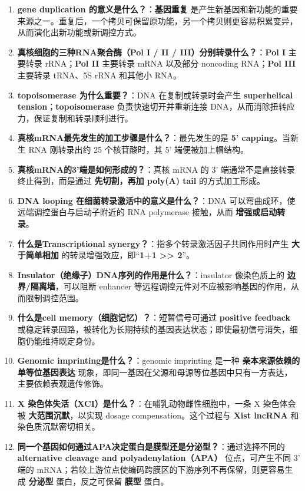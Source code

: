\documentclass[12pt,fontset=none]{ctexart}
\begin{document}
\begin{enumerate}
\item \textbf{gene duplication 的意义是什么？}：\textbf{基因重复} 是产生新基因和新功能的重要来源之一。重复后，一个拷贝可保留原功能，另一个拷贝则更容易积累变异，从而演化出新功能或新调控方式。

\item \textbf{真核细胞的三种RNA聚合酶（Pol I / II / III）分别转录什么？}：\textbf{Pol I} 主要转录 rRNA；\textbf{Pol II} 主要转录 mRNA 以及部分 noncoding RNA；\textbf{Pol III} 主要转录 tRNA、5S rRNA 和其他小 RNA。

\item \textbf{topoisomerase 为什么重要？}：DNA 在复制或转录时会产生 \textbf{superhelical tension}；\textbf{topoisomerase} 负责快速切开并重新连接 DNA，从而消除扭转应力，保证复制和转录顺利进行。

\item \textbf{真核mRNA最先发生的加工步骤是什么？}：最先发生的是 \textbf{5' capping}。当新生 RNA 刚转录出约 25 个核苷酸时，其 5' 端便被加上帽结构。

\item \textbf{真核mRNA的3'端是如何形成的？}：真核 mRNA 的 3' 端通常不是直接转录终止得到，而是通过 \textbf{先切割，再加 poly(A) tail} 的方式加工形成。

\item \textbf{DNA looping 在细菌转录激活中的意义是什么？}：DNA 可以弯曲成环，使远端调控蛋白与启动子附近的 RNA polymerase 接触，从而 \textbf{增强或启动转录}。

\item \textbf{什么是Transcriptional synergy？}：指多个转录激活因子共同作用时产生 \textbf{大于简单相加} 的转录增强效应，即“\textbf{1+1 >> 2}”。

\item \textbf{Insulator（绝缘子）DNA序列的作用是什么？}：insulator 像染色质上的 \textbf{边界/隔离墙}，可以阻断 enhancer 等远程调控元件对不应被影响基因的作用，从而限制调控范围。

\item \textbf{什么是cell memory（细胞记忆）？}：短暂信号可通过 \textbf{positive feedback} 或稳定转录回路，被转化为长期持续的基因表达状态；即使最初信号消失，细胞仍能维持既定身份。

\item \textbf{Genomic imprinting是什么？}：genomic imprinting 是一种 \textbf{亲本来源依赖的单等位基因表达} 现象，即同一基因在父源和母源等位基因中只有一方表达，主要依赖表观遗传修饰。

\item \textbf{X 染色体失活（XCI）是什么？}：在哺乳动物雌性细胞中，一条 X 染色体会被 \textbf{大范围沉默}，以实现 dosage compensation。这个过程与 \textbf{Xist lncRNA} 和染色质沉默密切相关。

\item \textbf{同一个基因如何通过APA决定蛋白是膜型还是分泌型？}：通过选择不同的 \textbf{alternative cleavage and polyadenylation（APA）} 位点，可产生不同 3' 端的 mRNA；若较上游位点使编码跨膜区的下游序列不再保留，则更容易生成 \textbf{分泌型} 蛋白，反之可保留 \textbf{膜型} 蛋白。
\end{enumerate}
\end{document}
